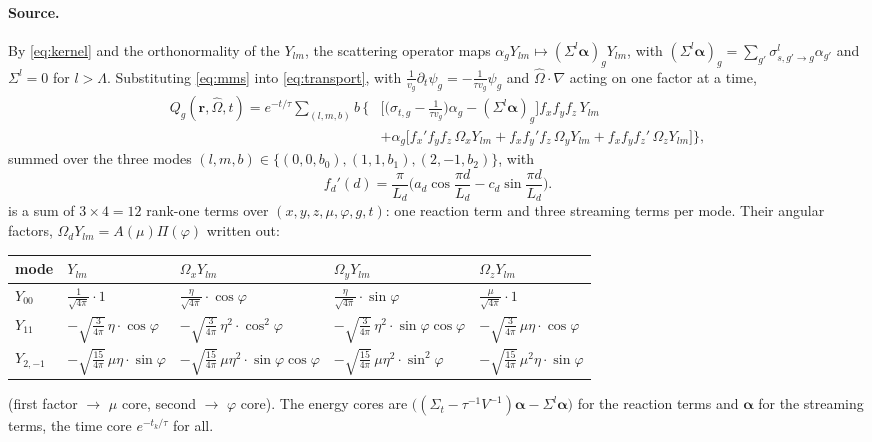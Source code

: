 \documentclass[11pt,a4paper]{article}
\newcommand{\Om}{\hat{\Omega}}
\newcommand{\Lmax}{\Lambda}
\begin{document}
\paragraph{Source.} By \eqref{eq:kernel} and the orthonormality of the $Y_{lm}$, the scattering operator maps $\alpha_gY_{lm}\mapsto(\Sigma^l\bm\alpha)_gY_{lm}$, with $(\Sigma^l\bm\alpha)_g=\sum_{g'}\sigma^l_{s,g'\to g}\alpha_{g'}$ and $\Sigma^l=0$ for $l>\Lmax$. Substituting \eqref{eq:mms} into \eqref{eq:transport}, with $\frac1{v_g}\partial_t\psi_g=-\frac{1}{\tau v_g}\psi_g$ and $\Om\cdot\nabla$ acting on one factor at a time,
\begin{equation}
\boxed{
\begin{aligned}
Q_g(\bm r,\Om,t)=e^{-t/\tau}\sum_{(l,m,b)}b\,\Big\{&\Big[\Big(\sigma_{t,g}-\frac{1}{\tau v_g}\Big)\alpha_g-(\Sigma^l\bm\alpha)_g\Big]f_xf_yf_z\,Y_{lm}\\
&+\alpha_g\Big[f_x'f_yf_z\,\Omega_xY_{lm}+f_xf_y'f_z\,\Omega_yY_{lm}+f_xf_yf_z'\,\Omega_zY_{lm}\Big]\Big\},
\end{aligned}}
\label{eq:mms-Q}
\end{equation}
summed over the three modes $(l,m,b)\in\{(0,0,b_0),(1,1,b_1),(2,-1,b_2)\}$, with
\begin{equation}
f_d'(d)=\frac{\pi}{L_d}\Big(a_d\cos\frac{\pi d}{L_d}-c_d\sin\frac{\pi d}{L_d}\Big).
\end{equation}
 is a sum of $3\times4=12$ rank-one terms over $(x,y,z,\mu,\varphi,g,t)$: one reaction term and three streaming terms per mode. Their angular factors, $\Omega_dY_{lm}=A(\mu)\Pi(\varphi)$ written out:
\begin{center}\small
\renewcommand{\arraystretch}{1.25}
\begin{tabular}{@{}lllll@{}}
\toprule
mode & $Y_{lm}$ & $\Omega_xY_{lm}$ & $\Omega_yY_{lm}$ & $\Omega_zY_{lm}$\\
\midrule
$Y_{00}$ & $\frac{1}{\sqrt{4\pi}}\cdot1$ & $\frac{\eta}{\sqrt{4\pi}}\cdot\cos\varphi$ & $\frac{\eta}{\sqrt{4\pi}}\cdot\sin\varphi$ & $\frac{\mu}{\sqrt{4\pi}}\cdot1$\\
$Y_{11}$ & $-\sqrt{\frac{3}{4\pi}}\,\eta\cdot\cos\varphi$ & $-\sqrt{\frac{3}{4\pi}}\,\eta^2\cdot\cos^2\varphi$ & $-\sqrt{\frac{3}{4\pi}}\,\eta^2\cdot\sin\varphi\cos\varphi$ & $-\sqrt{\frac{3}{4\pi}}\,\mu\eta\cdot\cos\varphi$\\
$Y_{2,-1}$ & $-\sqrt{\frac{15}{4\pi}}\,\mu\eta\cdot\sin\varphi$ & $-\sqrt{\frac{15}{4\pi}}\,\mu\eta^2\cdot\sin\varphi\cos\varphi$ & $-\sqrt{\frac{15}{4\pi}}\,\mu\eta^2\cdot\sin^2\varphi$ & $-\sqrt{\frac{15}{4\pi}}\,\mu^2\eta\cdot\sin\varphi$\\
\bottomrule
\end{tabular}
\end{center}
(first factor $\to$ $\mu$ core, second $\to$ $\varphi$ core). The energy cores are $\big((\Sigma_t-\tau^{-1}V^{-1})\bm\alpha-\Sigma^l\bm\alpha\big)$ for the reaction terms and $\bm\alpha$ for the streaming terms, the time core $e^{-t_k/\tau}$ for all.
\end{document}
